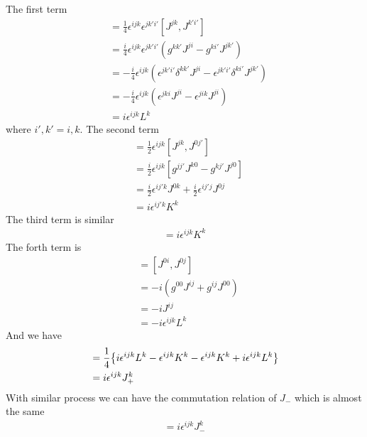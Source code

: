 \documentclass{article}
\begin{document}
The first term
\begin{align*}
  [L^i,L^j]&=\frac{1}{4}\epsilon^{ijk}\epsilon^{jk'i'}[J^{jk},J^{k'i'}]\\
  &=\frac{i}{4}\epsilon^{ijk}\epsilon^{jk'i'}(g^{kk'}J^{ji}-g^{ki'}J^{jk'})\\
  &=-\frac{i}{4}\epsilon^{ijk}(\epsilon^{jk'i'}\delta^{kk'}J^{ji}-\epsilon^{jk'i'}\delta^{ki'}J^{jk'})\\
  &=-\frac{i}{4}\epsilon^{ijk}(\epsilon^{jki}J^{ji}-\epsilon^{jik}J^{ji})\\
  &=i\epsilon^{ijk} L^k
\end{align*}
where $i',k'=i,k$.
The second term
\begin{align*}
  [L^i,K^j']&=\frac{1}{2}\epsilon^{ijk}[J^{jk},J^{0j'}]\\
  &=\frac{i}{2}\epsilon^{ijk}[g^{jj'}J^{k0}-g^{kj'}J^{j0}]\\
  &=\frac{i}{2}\epsilon^{ij'k}J^{0k}+\frac{i}{2}\epsilon^{ij'j}J^{0j}\\
  &=i\epsilon^{ij'k} K^{k}
\end{align*}
The third term is similar
\begin{align*}
  [K^i,L^j]=i\epsilon^{ijk}K^k
\end{align*}
The forth term is
\begin{align*}
  [K^i,K^j]&=[J^{0i},J^{0j}]\\
  &=-i(g^{00}J^{ij}+g^{ij}J^{00})\\
  &=-iJ^{ij}\\
  &=-i\epsilon^{ijk}L^k
\end{align*}
And we have
\begin{align*}
  [J^i_+,J^j_+]&=\frac{1}{4}\qty{i\epsilon^{ijk}L^k-\epsilon^{ijk}K^{k}-\epsilon^{ijk}K^{k}+i\epsilon^{ijk}L^k}\\
  &=i\epsilon^{ijk} J^k_+
\end{align*}
With similar process we can have the commutation relation of $J_-$ which is almost the same
\begin{align*}
  [J^i_-,J^j_-]=i\epsilon^{ijk}J^k_-
\end{align*}
\end{document}
